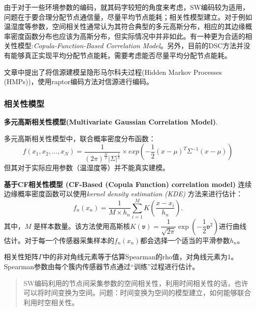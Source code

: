 由于对于一些环境参数的编码，就其码字较短的角度来考虑，SW编码较为适用，问题在于\textcolor[rgb]{1,0,0}{要合理分配节点通信量，尽量平均节点能耗；相关性模型建立}。对于例如温湿度等参数，空间相关性通常认为其符合典型的多元高斯分布，相应的其边缘概率密度函数分布也应该为高斯分布，但实际情况中并非如此。有一种更为合适的相关性模型:\emph{\textcolor[rgb]{1,0,0}{Copula-Function-Based Correlation Model}}。另外，目前的DSC方法并没有能够真正实现平均分配节点能耗，需要考虑能否尽量平均分配节点能耗。

文章\cite{Fresia2009}中提出了将信源建模呈隐形马尔科夫过程(Hidden Markov Processes (HMPs))，使用raptor编码方法对信源进行编码。

\subsubsection{相关性模型}
\textbf{多元高斯相关性模型(Multivariate Gaussian Correlation Model)}.

多元高斯相关性模型中，联合概率密度分布函数：
\begin{equation}
    f(x_1,x_2,\dots,x_N) = \dfrac{1}{(2\pi)^{\frac{N}{2}}|\Sigma|^{\frac{1}{2}}} \times exp\left( -\dfrac{1}{2} (x-\mu)^T \Sigma^{-1}(x-\mu) \right)
    \label{eq1.4}
\end{equation}
但其对于实际应用参数（温湿度等）并不能真实建模。

\textbf{基于CF相关性模型 (CF-Based (Copula Function) correlation model)}
连续边缘概率密度函数可以使用\emph{kernel density estimation (KDE)} 方法来进行估计：
\begin{equation}
    f_n(x_n) = \dfrac{1}{M \times h_n} \sum_{i=1}^{M}K\left( \dfrac{x-x_i}{h_n} \right).
    \label{eq1.11}
\end{equation}
其中，$M$ 是样本数量。该方法使用高斯核$K(\mathfrak{v}) = \dfrac{1}{\sqrt{2\pi}}\exp\left(-\dfrac{1}{2}\mathfrak{v}^2\right)$进行曲线估计。对于每一个传感器采集样本的$f_n(x_n)$都会选择一个适当的平滑参数$h_n$。

相关性矩阵$\Gamma$中的非对角线元素等于估算Spearman的rho值，对角线元素为1。Spearman参数由每个簇内传感器节点通过“训练”过程进行估计。

\begin{quotation}
    SW编码利用的节点间采集参数的空间相关性，利用时间相关性的话，也许可以将时间变换为空间。问题：时间变换为空间的模型建立，如何能够联合利用时空相关性。
\end{quotation}




